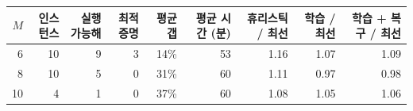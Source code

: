 \begin{tabular}{rrrrrrrrr}
\toprule
$M$ & 인스턴스 & 실행 가능해 & 최적 증명 & 평균 갭 & 평균 시간 (분) & 휴리스틱 / 최선 & 학습 / 최선 & 학습 + 복구 / 최선 \\
\midrule
6 & 10 & 9 & 3 & 14\% & 53 & 1.16 & 1.07 & 1.09 \\
8 & 10 & 5 & 0 & 31\% & 60 & 1.11 & 0.97 & 0.98 \\
10 & 4 & 1 & 0 & 37\% & 60 & 1.08 & 1.05 & 1.06 \\
\bottomrule
\end{tabular}%
